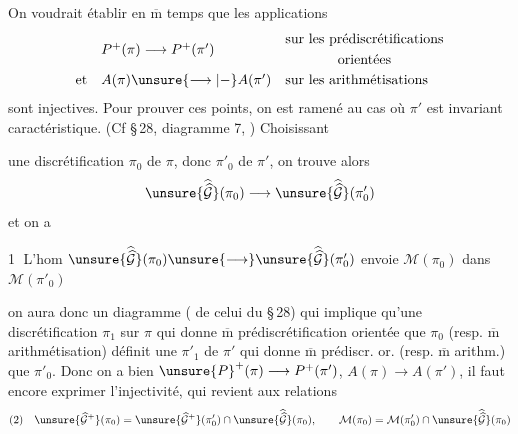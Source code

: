 On voudrait établir en $\overline{\mathrm m}$ temps que les applications
\[
\begin{array}{lll}
 &P^+(\pi)\longrightarrow P^+(\pi')&\begin{gathered}\text{sur les prédiscrétifications}\\\text{orientées}\end{gathered}\\[1em]
\text{et}&A(\pi)\unsure{\longrightarrow|-}A(\pi')&\text{sur les arithmétisations}
\end{array}
\]
sont injectives. Pour prouver ces points, on est ramené au cas où $\pi'$ est invariant caractéristique. (Cf \S\,28, diagramme 7, ) Choisissant

une discrétification $\pi_0$ de $\pi$, donc $\pi'_0$ de $\pi'$, on trouve alors
\[
\unsure{\widehat{\widehat{\mathcal G}}}(\pi_0)\longrightarrow
\unsure{\widehat{\widehat{\mathcal G}}}(\pi'_0)
\]
et on a

\textcircled{1} L'hom $\unsure{\widehat{\widehat{\mathcal G}}}(\pi_0)\unsure{\longrightarrow}\unsure{\widehat{\widehat{\mathcal G}}}(\pi'_0)$ envoie $\mathcal M(\pi_0)$ dans $\mathcal M(\pi'_0)$

on aura donc un diagramme ( de celui du \S\,28)
qui  implique qu'une discrétification $\pi_1$ sur $\pi$ qui donne $\overline{\mathrm m}$ prédiscrétification orientée que $\pi_0$ (resp. $\overline{\mathrm m}$ arithmétisation) définit une  $\pi'_1$ de $\pi'$ qui donne $\overline{\mathrm m}$ prédiscr. or. (resp. $\overline{\mathrm m}$ arithm.) que $\pi'_0$. Donc on a bien $\unsure{P}^{+}(\pi)\longrightarrow P^+(\pi')$, $A(\pi)\longrightarrow A(\pi')$, il faut encore exprimer l'injectivité, qui revient aux relations
\[
\begin{gathered}
(2)\quad
\unsure{\widehat{\mathcal G}^{+}}(\pi_0)
=
\unsure{\widehat{\mathcal G}^{+}}(\pi'_0)\cap
\unsure{\widehat{\widehat{\mathcal G}}}(\pi_0),\qquad
\mathcal M(\pi_0)=\mathcal M(\pi'_0)\cap
\unsure{\widehat{\widehat{\mathcal G}}}(\pi_0)
\end{gathered}
\]

